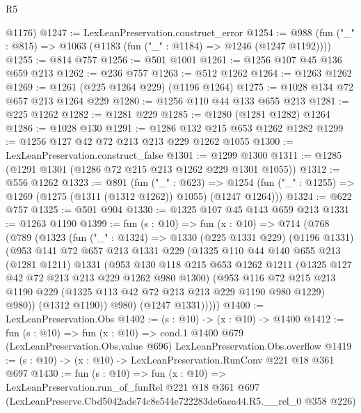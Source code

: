 \begin{lexlean}{R5}
\begin{coremodule}
      @1176)
@1247 := LexLeanPreservation.construct_error
@1254 := @988 (fun ("_" : @815) => @1063 (@1183 (fun ("_" : @1184) => @1246 (@1247 @1192))))
@1255 := @814 @757
@1256 := @501 @1001
@1261 := @1256 @107 @45 @136 @659 @213
@1262 := @236 @757
@1263 := @512 @1262
@1264 := @1263 @1262
@1269 := @1261 (@225 @1264 @229) (@1196 @1264)
@1275 := @1028 @134 @72 @657 @213 @1264 @229
@1280 := @1256 @110 @44 @133 @655 @213
@1281 := @225 @1262
@1282 := @1281 @229
@1285 := @1280 (@1281 @1282) @1264
@1286 := @1028 @130
@1291 := @1286 @132 @215 @653 @1262 @1282
@1299 := @1256 @127 @42 @72 @213 @213 @229 @1262 @1055
@1300 := LexLeanPreservation.construct_false
@1301 := @1299 @1300
@1311 := @1285 (@1291 @1301 (@1286 @72 @215 @213 @1262 @229 @1301 @1055))
@1312 := @556 @1262
@1323 := @891
    (fun ("_" : @623) =>
    @1254 (fun ("_" : @1255) => @1269 (@1275 (@1311 (@1312 @1262)) @1055) (@1247 @1264)))
@1324 := @622 @757
@1325 := @501 @904
@1330 := @1325 @107 @45 @143 @659 @213
@1331 := @1263 @1190
@1399 := fun (s : @10) =>
  fun (x : @10) =>
  @714
    (@768
      (@789
        (@1323
          (fun ("_" : @1324) =>
          @1330
            (@225 @1331 @229)
            (@1196 @1331)
            (@953
              @141
              @72
              @657
              @213
              @1331
              @229
              (@1325
                @110
                @44
                @140
                @655
                @213
                (@1281 @1211)
                @1331
                (@953
                  @130
                  @118
                  @215
                  @653
                  @1262
                  @1211
                  (@1325 @127 @42 @72 @213 @213 @229 @1262 @980 @1300)
                  (@953
                    @116
                    @72
                    @215
                    @213
                    @1190
                    @229
                    (@1325 @113 @42 @72 @213 @213 @229 @1190 @980 @1229)
                    @980))
                (@1312 @1190))
              @980)
            (@1247 @1331)))))
@1400 := LexLeanPreservation.Obs
@1402 := (s : @10) -> (x : @10) -> @1400
@1412 := fun (s : @10) =>
  fun (x : @10) =>
  cond.{1} @1400 @679 (LexLeanPreservation.Obs.value @696) LexLeanPreservation.Obs.overflow
@1419 := (s : @10) -> (x : @10) -> LexLeanPreservation.RunConv @221 @18 @361 @697
@1430 := fun (s : @10) =>
  fun (x : @10) =>
  LexLeanPreservation.run_of_funRel
    @221
    @18
    @361
    @697
    (LexLeanPreserve.Cbd5042ade74c8e544e722283de6aea44.R5.__rel_0 @358 @226)
\end{coremodule}
\end{lexlean}

